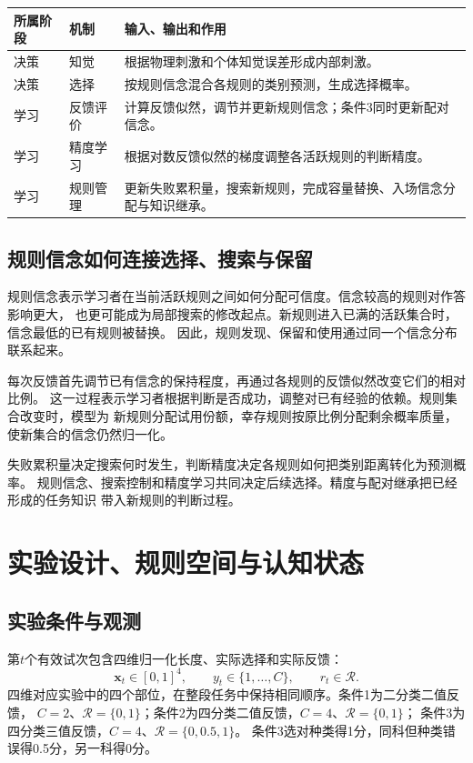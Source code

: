 \documentclass[11pt,a4paper]{article}
\numberwithin{equation}{section}
\newcommand{\Rr}{\mathcal{R}}
\begin{document}
{\small\noindent
\begin{tabularx}{\linewidth}{L{2.5cm}L{3.3cm}Y}
\toprule
所属阶段 & 机制 & 输入、输出和作用\\
\midrule
决策 & 知觉 & 根据物理刺激和个体知觉误差形成内部刺激。\\
决策 & 选择 & 按规则信念混合各规则的类别预测，生成选择概率。\\
学习 & 反馈评价 & 计算反馈似然，调节并更新规则信念；条件3同时更新配对信念。\\
学习 & 精度学习 & 根据对数反馈似然的梯度调整各活跃规则的判断精度。\\
学习 & 规则管理 & 更新失败累积量，搜索新规则，完成容量替换、入场信念分配与知识继承。\\
\bottomrule
\end{tabularx}}


\subsection{规则信念如何连接选择、搜索与保留}
规则信念表示学习者在当前活跃规则之间如何分配可信度。信念较高的规则对作答影响更大，
也更可能成为局部搜索的修改起点。新规则进入已满的活跃集合时，信念最低的已有规则被替换。
因此，规则发现、保留和使用通过同一个信念分布联系起来。

每次反馈首先调节已有信念的保持程度，再通过各规则的反馈似然改变它们的相对比例。
这一过程表示学习者根据判断是否成功，调整对已有经验的依赖。规则集合改变时，模型为
新规则分配试用份额，幸存规则按原比例分配剩余概率质量，使新集合的信念仍然归一化。

失败累积量决定搜索何时发生，判断精度决定各规则如何把类别距离转化为预测概率。
规则信念、搜索控制和精度学习共同决定后续选择。精度与配对继承把已经形成的任务知识
带入新规则的判断过程。

\section{实验设计、规则空间与认知状态}
\label{sec:state}

\subsection{实验条件与观测}
第$t$个有效试次包含四维归一化长度、实际选择和实际反馈：
\begin{equation}
\bm x_t\in[0,1]^4,\qquad y_t\in\{1,\ldots,C\},\qquad r_t\in\Rr.
\end{equation}
四维对应实验中的四个部位，在整段任务中保持相同顺序。条件1为二分类二值反馈，
$C=2$、$\Rr=\{0,1\}$；条件2为四分类二值反馈，$C=4$、$\Rr=\{0,1\}$；
条件3为四分类三值反馈，$C=4$、$\Rr=\{0,0.5,1\}$。
条件3选对种类得1分，同科但种类错误得0.5分，另一科得0分。
\end{document}
